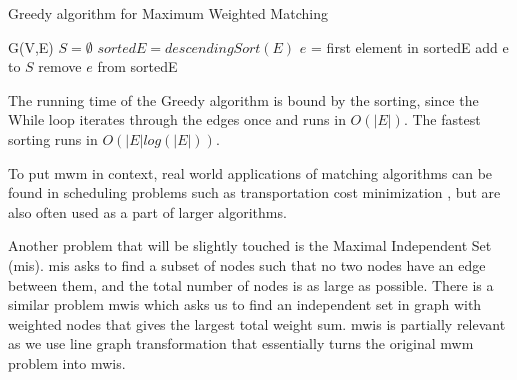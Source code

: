 \begin{algorithm}
\caption{Greedy algorithm for Maximum Weighted Matching}\label{alg:cap}

\begin{algorithmic}
\State G(V,E)
\State $S = \emptyset$
\State $sortedE = descendingSort(E)$
\State $e$ = first element in sortedE
  \State add e to $S$
  \State remove $e$ from sortedE
\EndIf
\EndWhile
\end{algorithmic}
\end{algorithm}

The running time of the Greedy algorithm is bound by the sorting, since the While loop iterates through the edges once and runs in $O(|E|)$. The fastest sorting runs in $O(|E| log(|E|))$.

To put \gls{mwm} in context, real world applications of matching algorithms can be found in scheduling problems such as transportation cost minimization \cite{mwmExample}, but are also often used as a part of larger algorithms.

Another problem that will be slightly touched is the Maximal Independent Set (\gls{mis}). \gls{mis} asks to find a subset of nodes such that no two nodes have an edge between them, and the total number of nodes is as large as possible. There is a similar problem \gls{mwis} which asks us to find an independent set in graph with weighted nodes that gives the largest total weight sum. \gls{mwis} is partially relevant as we use line graph transformation that essentially turns the original \gls{mwm} problem into \gls{mwis}.
